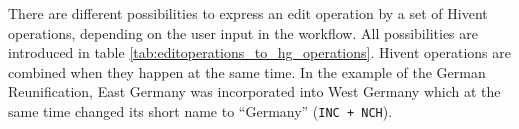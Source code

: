 

\vspace{-1.0em}

There are different possibilities to express an edit operation by a set of Hivent operations, depending on the user input in the workflow. All possibilities are introduced in table \ref{tab:editoperations_to_hg_operations}. Hivent operations are combined when they happen at the same time. In the example of the German Reunification, East Germany was incorporated into West Germany which at the same time changed its short name to ``Germany'' (\texttt{INC + NCH}).

